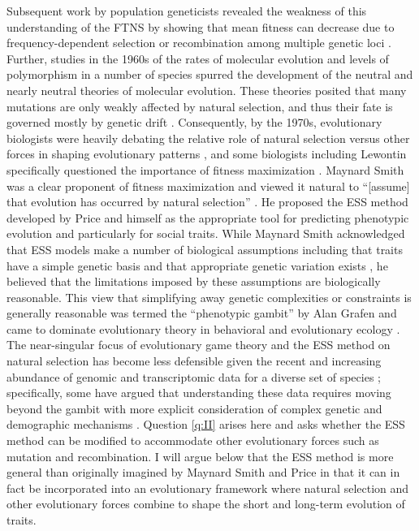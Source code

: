 \documentclass[11pt]{article}
\begin{document}
Subsequent work by population geneticists revealed the weakness of this understanding of the FTNS by showing that mean fitness can decrease due to frequency-dependent selection \cite{Wright:1955,Lewontin:1970} or recombination among multiple genetic loci \cite{Kojima:Kelleher:1961,Moran:1964,Karlin:1975,Akin:1979}. Further, studies in the 1960s of the rates of molecular evolution \cite{Zuckerkandl:Pauling:1965,King:Jukes:1969} and levels of polymorphism \cite{Harris:1966,Lewontin:Hubby:1966} in a number of species spurred the development of the neutral \cite{Kimura:1968,Kimura:1983:book} and nearly neutral \cite{Ohta:1974,Ohta:1992} theories \cite{Ohta:Gillespie:1996} of molecular evolution. These theories posited that many mutations are only weakly affected by natural selection, and thus their fate is governed mostly by genetic drift \cite{Kimura:1983:book}. Consequently, by the 1970s, evolutionary biologists were heavily debating the relative role of natural selection versus other forces in shaping evolutionary patterns \cite{Gillespie:Langley:1974,Gillespie:1978}, and some biologists including Lewontin specifically questioned the importance of fitness maximization \cite{Karlin:1975,Gould:Lewontin:1979}. Maynard Smith was a clear proponent of fitness maximization and viewed it natural to ``[assume] that evolution has occurred by natural selection'' \cite[p. 31]{MaynardSmith:1978}. He proposed the ESS method developed by Price and himself as the appropriate tool for predicting phenotypic evolution and particularly for social traits. While Maynard Smith acknowledged that ESS models make a number of biological assumptions including that traits have a simple genetic basis and that appropriate genetic variation exists \cite{MaynardSmith:1978}, he believed that the limitations imposed by these assumptions are biologically reasonable. This view that simplifying away genetic complexities or constraints is generally reasonable was termed the ``phenotypic gambit'' by Alan Grafen \cite{Grafen:1984} and came to dominate evolutionary theory in behavioral and evolutionary ecology \cite{Houston:McNamara:1999}. The near-singular focus of evolutionary game theory and the ESS method on natural selection has become less defensible given the recent and increasing abundance of genomic and transcriptomic data for a diverse set of species \cite[e.g.,][]{Kapheim:Pan:2015,Mikheyev:Linksvayer:2015,Warner:Mikheyev:2017,Kocher:Mallarino:2018,Warner:Mikheyev:2019}; specifically, some have argued that understanding these data requires moving beyond the gambit with more explicit consideration of complex genetic and demographic mechanisms \cite[e.g.,][]{Springer:Crespi:2011,Rittschof:Robinson:2014,Akcay:Linksvayer:2015,Cunningham:2020}. Question \ref{q:II} arises here and asks whether the ESS method can be modified to accommodate other evolutionary forces such as mutation and recombination. I will argue below that the ESS method is more general than originally imagined by Maynard Smith and Price \cite{Maynard-Smith:Price:1973} in that it can in fact be incorporated into an evolutionary framework where natural selection and other evolutionary forces combine to shape the short and long-term evolution of traits.
\end{document}
